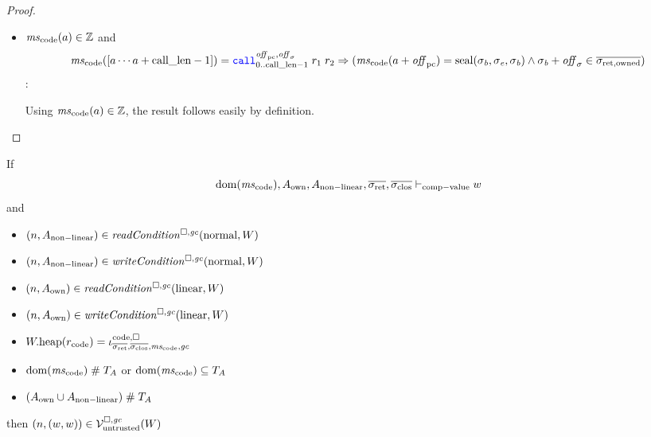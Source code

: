 \documentclass[a4paper]{article}
\begin{document}
\begin{proof}
\begin{itemize}
  \item $\mscode(a) \in \ints$ and
    \begin{equation*}
      \mscode([a \cdots a + \calllen-1]) = \scall[0..\calllen-1]{\offpc,\offsigma}{r_1}{r_2} \Rightarrow (\mscode(a+\offpc) = \seal{\sigma_\baddr,\sigma_\eaddr,\sigma_\baddr} \wedge \sigma_\baddr+\offsigma \in \sigrets[\mathrm{owned}])
    \end{equation*}:

    Using $\mscode(a) \in \ints$, the result follows easily by definition.
  \end{itemize}
\end{proof}

\begin{lemma}
  \label{lem:ftlr-comp-value}
  If
  \begin{equation*}
    \dom(\mscode), A_{\mathrm{own}}, A_{\mathrm{non-linear}}, \sigrets,\sigcloss \vdash_{\mathrm{comp-value}} w
  \end{equation*}
  and
  \begin{itemize}
  \item $\npair{A_{\mathrm{non-linear}}} \in \readCond{\normal,W}$
  \item $\npair{A_{\mathrm{non-linear}}} \in \writeCond{\normal,W}$
  \item $\npair{A_{\mathrm{own}}} \in \readCond{\linear,W}$
  \item $\npair{A_{\mathrm{own}}} \in \writeCond{\linear,W}$
  \item $\pwheap(r_{\mathrm{code}}) = \codereg{\sigrets,\sigcloss,\mscode,\gc}$
  \item $\dom(\mscode) \mathrel{\#} \ta$ or $\dom(\mscode) \subseteq \ta$
  \item $(A_{\mathrm{own}} \cup A_{\mathrm{non-linear}}) \mathrel{\#} T_{A}$
  \end{itemize}

  then $\left(n,(w,w)\right) \in \mathcal{V}^{\square,\mathit{gc}}_{\mathrm{untrusted}}(W)$
\end{lemma}
\end{document}

